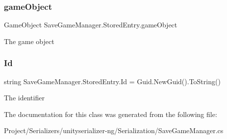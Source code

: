 \subsubsection{\texorpdfstring{game\+Object}{gameObject}}
{\footnotesize\ttfamily Game\+Object Save\+Game\+Manager.\+Stored\+Entry.\+game\+Object}



The game object 

\mbox{\label{class_save_game_manager_1_1_stored_entry_ae7208d742a7ac6d0fce5e5af39330e0c}} 
\subsubsection{\texorpdfstring{Id}{Id}}
{\footnotesize\ttfamily string Save\+Game\+Manager.\+Stored\+Entry.\+Id = Guid.\+New\+Guid().To\+String()}



The identifier 



The documentation for this class was generated from the following file\+:\begin{DoxyCompactItemize}
\item 
Project/\+Serializers/unityserializer-\/ng/\+Serialization/Save\+Game\+Manager.\+cs\end{DoxyCompactItemize}
